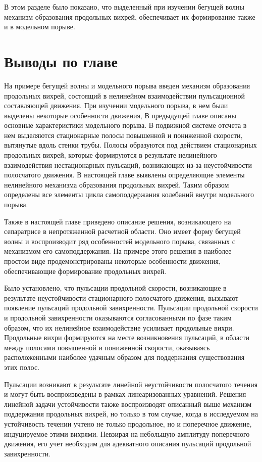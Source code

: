В этом разделе было показано, что выделенный при изучении бегущей волны механизм образования продольных вихрей, обеспечивает их формирование также и в модельном порыве. 


\section{Выводы по главе}

На примере бегущей волны и модельного порыва введен механизм образования продольных вихрей, состоящий в нелинейном взаимодействии пульсационной составляющей движения. 
При изучении модельного порыва, в нем 	были выделены некоторые особенности движения, 
В предыдущей главе описаны основные характеристики модельного порыва. В подвижной системе отсчета в нем выделяются стационарные полосы повышенной и пониженной скорости, вытянутые вдоль стенки трубы. Полосы образуются под действием стационарных продольных вихрей, которые формируются в результате нелинейного взаимодействия нестационарных пульсаций, возникающих из-за неустойчивости полосчатого движения. В настоящей главе выявлены определяющие элементы нелинейного механизма образования продольных вихрей. Таким образом определены все элементы цикла самоподдержания колебаний внутри модельного порыва. 

Также в настоящей главе приведено описание решения, возникающего на сепаратрисе в непротяженной расчетной области. Оно имеет форму бегущей волны и воспроизводит ряд особенностей модельного порыва, связанных с механизмом его самоподдержания. На примере этого решения в наиболее простом виде продемонстрированы некоторые особенности движения, обеспечивающие формирование продольных вихрей. 

Было установлено, что пульсации продольной скорости, возникающие в результате неустойчивости стационарного полосчатого движения, вызывают появление пульсаций продольной завихренности. Пульсации продольной скорости и продольной завихренности оказываются согласованными по фазе таким образом, что их нелинейное взаимодействие усиливает продольные вихри. Продольные вихри формируются на месте возникновения пульсаций, в области между полосами повышенной и пониженной скорости, оказываясь расположенными наиболее удачным образом для поддержания существования этих полос.

Пульсации возникают в результате линейной неустойчивости полосчатого течения и могут быть воспроизведены в рамках линеаризованных уравнений. Решения линейной задачи устойчивости также воспроизводят описанный выше механизм поддержания продольных вихрей, но только в том случае, когда в исследуемом на устойчивость течении учтено не только продольное, но и поперечное движение, индуцируемое этими вихрями. Невзирая на небольшую амплитуду поперечного движения, его учет необходим для адекватного описания пульсаций продольной завихренности.

